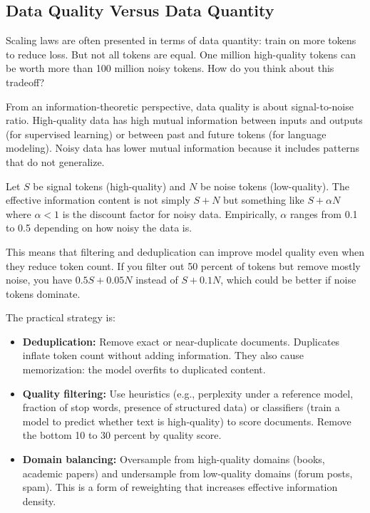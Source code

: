 \vspace{1em}

\subsection{Data Quality Versus Data Quantity}

Scaling laws are often presented in terms of data quantity: train on more tokens to reduce loss. But not all tokens are equal. One million high-quality tokens can be worth more than 100 million noisy tokens. How do you think about this tradeoff?

From an information-theoretic perspective, data quality is about signal-to-noise ratio. High-quality data has high mutual information between inputs and outputs (for supervised learning) or between past and future tokens (for language modeling). Noisy data has lower mutual information because it includes patterns that do not generalize.

Let $S$ be signal tokens (high-quality) and $N$ be noise tokens (low-quality). The effective information content is not simply $S + N$ but something like $S + \alpha N$ where $\alpha < 1$ is the discount factor for noisy data. Empirically, $\alpha$ ranges from 0.1 to 0.5 depending on how noisy the data is.

This means that filtering and deduplication can improve model quality even when they reduce token count. If you filter out 50 percent of tokens but remove mostly noise, you have $0.5S + 0.05N$ instead of $S + 0.1N$, which could be better if noise tokens dominate.

The practical strategy is:

\begin{itemize}
\item \textbf{Deduplication:} Remove exact or near-duplicate documents. Duplicates inflate token count without adding information. They also cause memorization: the model overfits to duplicated content.

\item \textbf{Quality filtering:} Use heuristics (e.g., perplexity under a reference model, fraction of stop words, presence of structured data) or classifiers (train a model to predict whether text is high-quality) to score documents. Remove the bottom 10 to 30 percent by quality score.

\item \textbf{Domain balancing:} Oversample from high-quality domains (books, academic papers) and undersample from low-quality domains (forum posts, spam). This is a form of reweighting that increases effective information density.
\end{itemize}


